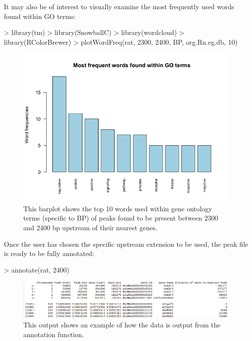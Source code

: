 \documentclass[12pt]{article}
\begin{document}
It may also be of interest to visually examine the most frequently used words found within GO terms:  

\begin{Schunk}
\begin{Sinput}
> library(tm)
> library(SnowballC)
> library(wordcloud)
> library(RColorBrewer)
> plotWordFreq(rat, 2300, 2400, BP, org.Rn.eg.db, 10)
\end{Sinput}
\end{Schunk}

\begin{figure}[H]
\centering
\includegraphics{figures/vignette_wordfreq.png}
\caption{This barplot shows the top 10 words used within gene ontology terms (specific to BP) of peaks found to be present between 2300 and 2400 bp upstream of their nearest genes.}
\end{figure}


Once the user has chosen the specific upstream extension to be used, the peak file is ready to be fully annotated:

\begin{Schunk}
\begin{Sinput}
> annotate(rat, 2400)
\end{Sinput}
\end{Schunk}

\begin{figure}[H]
\centering
\includegraphics{figures/vignette_annotate_2400.PNG}
\caption{This output shows an example of how the data is output from the annotation function.}
\end{figure}
\end{document}
